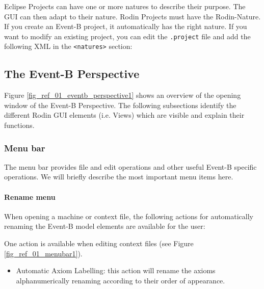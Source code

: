 Eclipse Projects can have one or more natures to describe their purpose.  The GUI can then adapt to their nature.  Rodin Projects must have the Rodin-Nature.  If you create an Event-B project, it automatically has the right nature.  If you want to modify an existing project, you can edit the \texttt{.project} file and add the following XML in the \texttt{<natures>} section:



\subsection{The Event-B Perspective}
\label{event_b_perspective}


Figure \ref{fig_ref_01_eventb_perspective1} shows an overview of the opening window of the Event-B Perspective. The following subsections identify the different Rodin GUI elements (i.e. Views) which are visible and explain their functions.


\subsubsection{Menu bar}
\label{menu_bar}

The menu bar provides file and edit operations and other useful Event-B specific operations. We will briefly describe the most important menu items here.

\paragraph{Rename menu}

When opening a machine or context file, the following actions for automatically renaming the Event-B model elements are available for the user:

One action is available when editing context files (see Figure \ref{fig_ref_01_menubar1}).

    \begin{itemize}
    	\item Automatic Axiom Labelling: this action will rename the axioms alphanumerically renaming according to their order of appearance. 
    \end{itemize}

